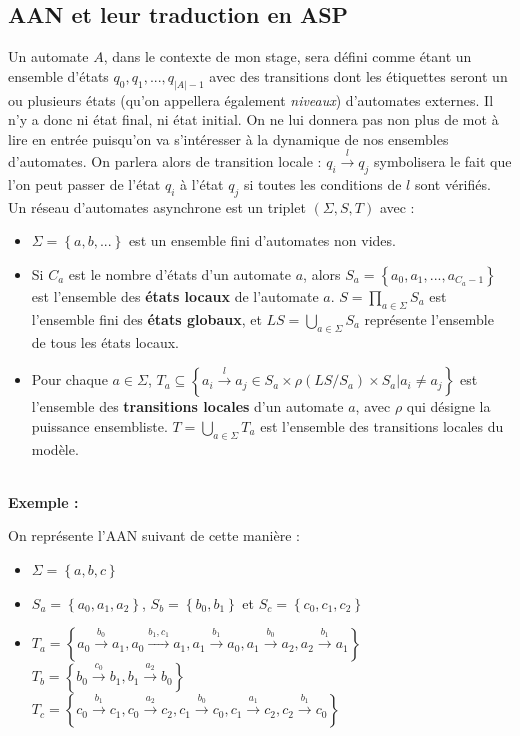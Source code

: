 \documentclass[12pt,a4paper]{article}
\begin{document}
\subsection{AAN et leur traduction en ASP}
Un automate $A$, dans le contexte de mon stage, sera défini comme étant un ensemble d'états $q_0, q_1, ..., q_{|A|-1}$ avec des transitions dont les étiquettes seront un ou plusieurs états (qu'on appellera également \emph{niveaux}) 
d'automates externes. Il n'y a donc ni état final, ni état initial. On ne lui donnera pas non plus de mot à lire en entrée puisqu'on va s'intéresser à la dynamique de nos ensembles d'automates. On parlera alors de 
transition locale : $q_i\xrightarrow{l}q_j$ symbolisera le fait que l'on peut passer de l'état $q_i$ à l'état $q_j$ si toutes les conditions de $l$ sont vérifiés.\\
Un réseau d'automates asynchrone est un triplet $(\Sigma,S,T)$ avec :
\begin{itemize}
	\item $\Sigma=\left\{a,b,...\right\}$ est un ensemble fini d'automates non vides.
	\item Si $C_a$ est le nombre d'états d'un automate $a$, alors $S_a=\left\{a_0,a_1,...,a_{C_a-1}\right\}$ est l'ensemble des \textbf{états locaux} de l'automate $a$. $S=\displaystyle{\prod_{a\in\Sigma}}S_a$ est l'ensemble 
	fini des \textbf{états globaux}, et $LS=\displaystyle{\bigcup_{a\in\Sigma}}S_a$ représente l'ensemble de tous les états locaux.
	\item Pour chaque $a\in\Sigma$, $T_a\subseteq\left\{a_i\xrightarrow{l}a_j\in S_a\times\rho(LS/S_a)\times S_a|a_i\neq a_j\right\}$ est l'ensemble des \textbf{transitions locales} d'un automate $a$, avec 
	$\rho$ qui désigne la puissance ensembliste. $T=\displaystyle{\bigcup_{a\in\Sigma}}T_a$ est l'ensemble des transitions locales du modèle.\\ \\
\end{itemize}
\hypertarget{exemple}{\textbf{Exemple :}} On représente l'AAN suivant de cette manière :
\begin{itemize}
	\item $\Sigma =\left\{a,b,c\right\}$
	\item $S_a=\left\{a_0,a_1,a_2\right\}$, $S_b=\left\{b_0,b_1\right\}$ et $S_c=\left\{c_0,c_1,c_2\right\}$
	\item $T_a = \left\{a_0\xrightarrow{b_0}a_1,a_0\xrightarrow{b_1,c_1}a_1,a_1\xrightarrow{b_1}a_0,a_1\xrightarrow{b_0}a_2,a_2\xrightarrow{b_1}a_1\right\}$\\
	$T_b=\left\{b_0\xrightarrow{c_0}b_1,b_1\xrightarrow{a_2}b_0\right\}$\\
	$T_c=\left\{c_0\xrightarrow{b_1}c_1,c_0\xrightarrow{a_2}c_2,c_1\xrightarrow{b_0}c_0,c_1\xrightarrow{a_1}c_2,c_2\xrightarrow{b_1}c_0\right\}$
\end{itemize}
\end{document}
